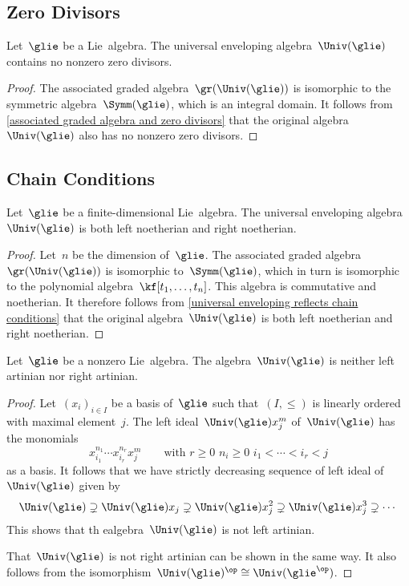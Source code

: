 \subsection*{Zero Divisors}

\begin{proposition}
	\label{uea contains no zero divisors}
	Let~$\glie$ be a Lie~algebra.
	The universal enveloping algebra~$\Univ(\glie)$ contains no nonzero zero divisors.
\end{proposition}


\begin{proof}
	The associated graded algebra~$\gr(\Univ(\glie))$ is isomorphic to the symmetric algebra~$\Symm(\glie)$, which is an integral domain.
	It follows from \cref{associated graded algebra and zero divisors} that the original algebra~$\Univ(\glie)$ also has no nonzero zero divisors.
\end{proof}



\subsection*{Chain Conditions}

\begin{proposition}
	Let~$\glie$ be a finite-dimensional Lie~algebra.
	The universal enveloping algebra~$\Univ(\glie)$ is both left noetherian and right noetherian.
\end{proposition}


\begin{proof}
	Let~$n$ be the dimension of~$\glie$.
	The associated graded algebra~$\gr(\Univ(\glie))$ is isomorphic to~$\Symm(\glie)$, which in turn is isomorphic to the polynomial algebra~$\kf[t_1, \dotsc, t_n]$.
	This algebra is commutative and noetherian.
	It therefore follows from \cref{universal enveloping reflects chain conditions} that the original algebra~$\Univ(\glie)$ is both left noetherian and right noetherian.
\end{proof}


\begin{proposition}
	Let~$\glie$ be a nonzero Lie~algebra.
	The algebra~$\Univ(\glie)$ is neither left artinian nor right artinian.
\end{proposition}


\begin{proof}
	Let~$(x_i)_{i \in I}$ be a basis of~$\glie$ such that~$(I, \leq)$ is linearly ordered with maximal element~$j$.
	The left ideal~$\Univ(\glie) x_j^m$ of~$\Univ(\glie)$ has the monomials
	\[
		x_{i_1}^{n_1} \dotsm x_{i_r}^{n_r} x_j^m
		\qquad
		\text{with~$r \geq 0$~$n_i \geq 0$~$i_1 < \dotsb < i_r < j$}
	\]
	as a basis.
	It follows that we have strictly decreasing sequence of left ideal of~$\Univ(\glie)$ given by
	\[
		\Univ(\glie)
		\supsetneq
		\Univ(\glie) x_j
		\supsetneq
		\Univ(\glie) x_j^2
		\supsetneq
		\Univ(\glie) x_j^3
		\supsetneq
		\dotsb
	\]
	This shows that th ealgebra~$\Univ(\glie)$ is not left artinian.

	That~$\Univ(\glie)$ is not right artinian can be shown in the same way.
	It also follows from the isomorphism~$\Univ(\glie)^{\op} \cong \Univ(\glie^{\op})$.
\end{proof}


